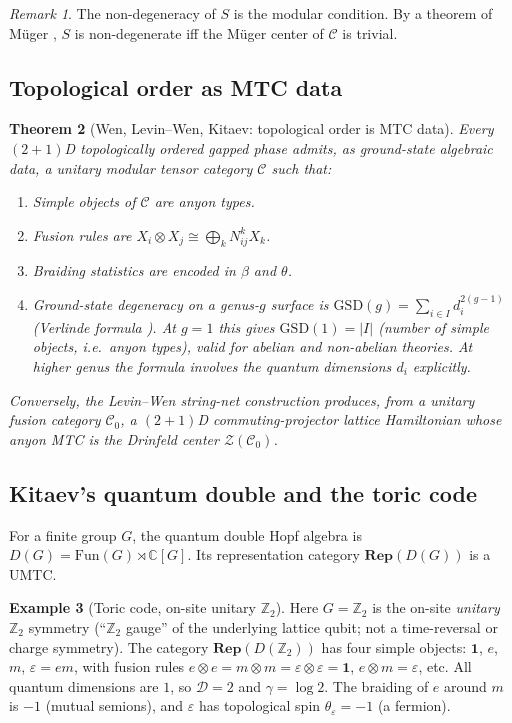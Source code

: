 \documentclass[12pt]{article}
\theoremstyle{plain}
\newtheorem{theorem}{Theorem}[section]
\theoremstyle{definition}
\newtheorem{example}[theorem]{Example}
\theoremstyle{remark}
\newtheorem{remark}[theorem]{Remark}
\newcommand{\Rep}{\mathbf{Rep}}
\begin{document}
\begin{remark}
The non-degeneracy of $S$ is the modular condition. By a theorem of M\"uger
\cite{Muger2003}, $S$ is non-degenerate iff the M\"uger center of $\mathcal{C}$ is trivial.
\end{remark}

\subsection{Topological order as MTC data}

\begin{theorem}[Wen, Levin--Wen, Kitaev: topological order is MTC data]
\label{thm:top-order-mtc}
Every $(2{+}1)$D topologically ordered gapped phase admits, as ground-state algebraic
data, a unitary modular tensor category $\mathcal{C}$ such that:
\begin{enumerate}[label=(\arabic*)]
  \item Simple objects of $\mathcal{C}$ are anyon types.
  \item Fusion rules are $X_{i}\otimes X_{j}\cong\bigoplus_{k}N_{ij}^{k}X_{k}$.
  \item Braiding statistics are encoded in $\beta$ and $\theta$.
  \item Ground-state degeneracy on a genus-$g$ surface is
    $\mathrm{GSD}(g) = \sum_{i\in I} d_{i}^{2(g-1)}$ (Verlinde formula
    \cite{Wang2010}). At $g=1$ this gives $\mathrm{GSD}(1)=|I|$ (number of simple
    objects, i.e.\ anyon types), valid for abelian \emph{and} non-abelian theories. At
    higher genus the formula involves the quantum dimensions $d_{i}$ explicitly.
\end{enumerate}
Conversely, the Levin--Wen string-net construction \cite{LevinWen2005} produces, from a
unitary fusion category $\mathcal{C}_{0}$, a $(2{+}1)$D commuting-projector lattice
Hamiltonian whose anyon MTC is the Drinfeld center $\mathcal{Z}(\mathcal{C}_{0})$.
\end{theorem}

\subsection{Kitaev's quantum double and the toric code}

For a finite group $G$, the quantum double Hopf algebra is
$D(G)=\mathrm{Fun}(G)\rtimes\mathbb{C}[G]$. Its representation category
$\Rep(D(G))$ is a UMTC.

\begin{example}[Toric code, on-site unitary $\mathbb{Z}_{2}$]
\label{ex:toric}
Here $G=\mathbb{Z}_{2}$ is the on-site \emph{unitary} $\mathbb{Z}_{2}$ symmetry
(``$\mathbb{Z}_{2}$ gauge'' of the underlying lattice qubit; not a time-reversal or
charge symmetry). The category $\Rep(D(\mathbb{Z}_{2}))$ has four simple objects:
$\mathbf{1}$, $e$, $m$, $\varepsilon=em$,
with fusion rules $e\otimes e=m\otimes m=\varepsilon\otimes\varepsilon=\mathbf{1}$,
$e\otimes m=\varepsilon$, etc. All quantum dimensions are $1$, so $\mathcal{D}=2$ and
$\gamma=\log 2$. The braiding of $e$ around $m$ is $-1$ (mutual semions), and
$\varepsilon$ has topological spin $\theta_{\varepsilon}=-1$ (a fermion).
\end{example}
\end{document}
